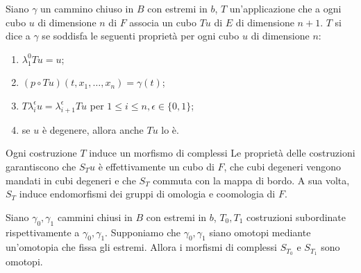 \begin{definition}
Siano $\gamma$ un cammino chiuso in $B$ con estremi in $b$, $T$ un'applicazione che a ogni cubo $u$ di dimensione $n$ di $F$ associa un cubo $Tu$ di $E$ di dimensione $n+1$. $T$ si dice  a $\gamma$ se soddisfa le seguenti proprietà per ogni cubo $u$ di dimensione $n$:
\begin{enumerate}
\item $\lambda^0_1 Tu=u$;
\item $(p\circ Tu)(t,x_1,\ldots,x_n)=\gamma(t)$;
\item $T\lambda^\epsilon_iu=\lambda^\epsilon_{i+1}Tu$ per $1\le i\le n,\epsilon\in\{0,1\}$;
\item se $u$ è degenere, allora anche $Tu$ lo è.
\end{enumerate}
\end{definition}
Ogni costruzione $T$ induce un morfismo di complessi
Le proprietà delle costruzioni garantiscono che $S_Tu$ è effettivamente un cubo di $F$, che cubi degeneri vengono mandati in cubi degeneri e che $S_T$ commuta con la mappa di bordo. A sua volta, $S_T$ induce endomorfismi dei gruppi di omologia e coomologia di $F$.
\begin{proposition}
Siano $\gamma_0,\gamma_1$ cammini chiusi in $B$ con estremi in $b$, $T_0,T_1$ costruzioni subordinate rispettivamente a $\gamma_0,\gamma_1$. Supponiamo che $\gamma_0,\gamma_1$ siano omotopi mediante un'omotopia che fissa gli estremi. Allora i morfismi di complessi $S_{T_0}$ e $S_{T_1}$ sono omotopi.
\end{proposition}
